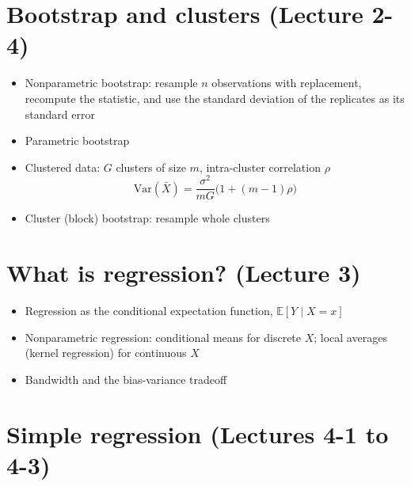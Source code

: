 \documentclass[11pt]{article}
\newcommand\E{\mathbb{E}}
\newcommand\Var{\text{Var}}
\begin{document}
\section{Bootstrap and clusters (Lecture 2-4)}

\begin{itemize}
\item Nonparametric bootstrap: resample $n$ observations with replacement, recompute the statistic,
  and use the standard deviation of the replicates as its standard error
\item Parametric bootstrap
\item Clustered data: $G$ clusters of size $m$, intra-cluster correlation $\rho$
\[
\Var(\bar X)=\frac{\sigma^2}{mG}\big(1+(m-1)\rho\big)
\]
\item Cluster (block) bootstrap: resample whole clusters
\end{itemize}

\section{What is regression? (Lecture 3)}

\begin{itemize}
\item Regression as the conditional expectation function, $\E[Y\mid X=x]$
\item Nonparametric regression: conditional means for discrete $X$; local averages (kernel
  regression) for continuous $X$
\item Bandwidth and the bias-variance tradeoff
\end{itemize}

\section{Simple regression (Lectures 4-1 to 4-3)}
\end{document}
